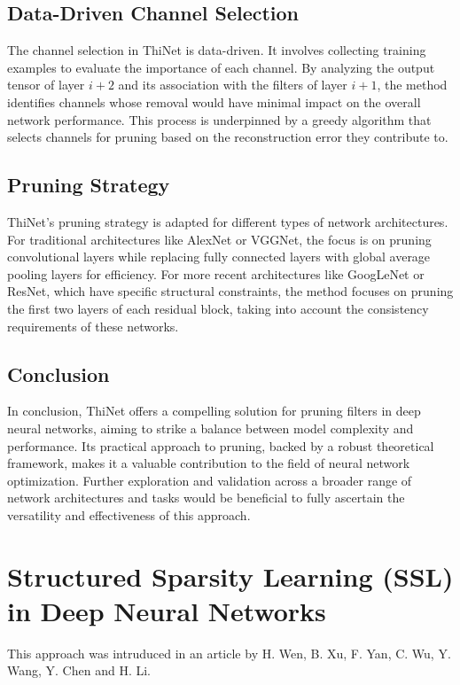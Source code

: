 \subsection{Data-Driven Channel Selection}

The channel selection in ThiNet is data-driven. It involves collecting training examples to evaluate the importance of each channel. By analyzing the output tensor of layer $i + 2$ and its association with the filters of layer $i + 1$, the method identifies channels whose removal would have minimal impact on the overall network performance. This process is underpinned by a greedy algorithm that selects channels for pruning based on the reconstruction error they contribute to.

\subsection{Pruning Strategy}

ThiNet's pruning strategy is adapted for different types of network architectures. For traditional architectures like AlexNet or VGGNet, the focus is on pruning convolutional layers while replacing fully connected layers with global average pooling layers for efficiency. For more recent architectures like GoogLeNet or ResNet, which have specific structural constraints, the method focuses on pruning the first two layers of each residual block, taking into account the consistency requirements of these networks.

\subsection{Conclusion}
In conclusion, ThiNet offers a compelling solution for pruning filters in deep neural networks, aiming to strike a balance between model complexity and performance. Its practical approach to pruning, backed by a robust theoretical framework, makes it a valuable contribution to the field of neural network optimization. Further exploration and validation across a broader range of network architectures and tasks would be beneficial to fully ascertain the versatility and effectiveness of this approach.


\section{Structured Sparsity Learning (SSL) in Deep Neural Networks}
This approach was intruduced in an article \cite{ssl} by H. Wen, B. Xu, F. Yan, C. Wu, Y. Wang, Y. Chen and H. Li.

